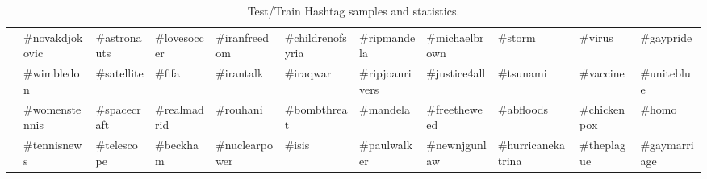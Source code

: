 \documentclass[letterpaper]{article}
\begin{document}
\begin{table}[t!]
{\begin{tabular}{|l|l|l|l|l|l|l|l|l|l|l|}
                                          & \#novakdjokovic                      & \#astronauts                        & \#lovesoccer                         & \#iranfreedom                          & {\footnotesize \#childrenofsyria}                           & \#ripmandela                                 & \#michaelbrown                             & \#storm                                & \#virus                                 & \#gaypride                         \\ \cline{2-11} 
                                          & \#wimbledon                          & \#satellite                         & \#fifa                               & \#irantalk                             & \#iraqwar                                   & \#ripjoanrivers                              & \#justice4all                              & \#tsunami                                 & \#vaccine                               & \#uniteblue                        \\ \cline{2-11} 
                                          & \#womenstennis                       & \#spacecraft                        & \#realmadrid                         & \#rouhani                              & \#bombthreat                                & \#mandela                                    & \#freetheweed                              & \#abfloods                                 & \#chickenpox                            & \#homo                             \\ \cline{2-11} 
                                          & \#tennisnews                         & \#telescope                         & \#beckham                            & \#nuclearpower                         & \#isis                                      & \#paulwalker                                 & \#newnjgunlaw                              & \#hurricanekatrina                                 & \#theplague                             & {\footnotesize \#gaymarriage}                      \\ \hline
\end{tabular}
}
\caption{Test/Train Hashtag samples and statistics.}
\label{table:sampleHashtags}
\end{table}
\end{document}
